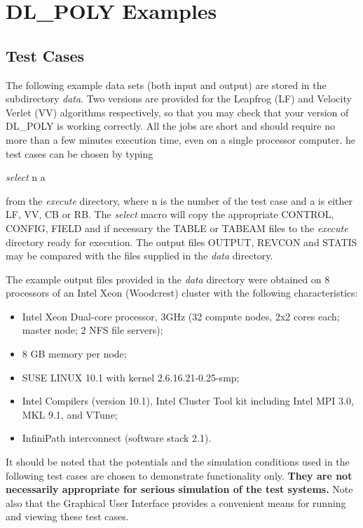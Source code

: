 
\section{DL\_POLY Examples}

\subsection{Test Cases}

The following example data sets (both input and output) are stored in
the subdirectory {\em data}. Two versions are provided for the
Leapfrog (LF) and Velocity Verlet (VV) algorithms respectively,
so that you may check that your version of DL\_POLY is
working correctly.  All the jobs are short and should require no more
than a few minutes execution time, even on a single processor
computer.  he test cases can be chosen by typing

{\sl select } n a

\noindent from the {\em execute} directory, where n is the number of the test
case and a is either LF, VV, CB or RB.  The {\sl select} macro will
copy the appropriate CONTROL, CONFIG, FIELD and if necessary the TABLE
or TABEAM files to the {\em execute} directory ready for execution.
The output files OUTPUT, REVCON and STATIS may be compared with the
files supplied in the {\em data} directory.

The example output files provided in the {\em data} directory were
obtained on 8 processors of an Intel Xeon (Woodcrest) cluster with the
following characteristics:
\begin{itemize}
\item Intel Xeon Dual-core processor, 3GHz (32 compute nodes, 2x2 cores each;
master node; 2 NFS file servers);
\item 8 GB memory per node;
\item SUSE LINUX 10.1 with kernel 2.6.16.21-0.25-smp;
\item Intel Compilers (version 10.1), Intel Cluster Tool kit including Intel
MPI 3.0, MKL 9.1, and VTune;
\item InfiniPath interconnect (software stack 2.1).
\end{itemize}

It should be noted that the potentials and the simulation conditions
used in the following test cases are chosen to demonstrate
functionality only.  {\bf They are not necessarily appropriate for serious
simulation of the test systems.}  Note also that the \D{} Graphical User
Interface \cite{smith-gui} provides a convenient means for running and
viewing these test cases.

